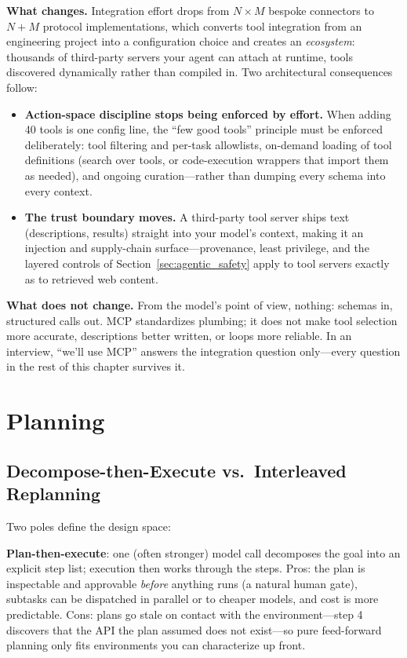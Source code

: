 \textbf{What changes.} Integration effort drops from $N \times M$ bespoke connectors to $N + M$ protocol implementations, which converts tool integration from an engineering project into a configuration choice and creates an \textit{ecosystem}: thousands of third-party servers your agent can attach at runtime, tools discovered dynamically rather than compiled in. Two architectural consequences follow:

\begin{itemize}
    \item \textbf{Action-space discipline stops being enforced by effort.} When adding 40 tools is one config line, the ``few good tools'' principle must be enforced deliberately: tool filtering and per-task allowlists, on-demand loading of tool definitions (search over tools, or code-execution wrappers that import them as needed), and ongoing curation---rather than dumping every schema into every context.
    \item \textbf{The trust boundary moves.} A third-party tool server ships text (descriptions, results) straight into your model's context, making it an injection and supply-chain surface---provenance, least privilege, and the layered controls of Section~\ref{sec:agentic_safety} apply to tool servers exactly as to retrieved web content.
\end{itemize}

\textbf{What does not change.} From the model's point of view, nothing: schemas in, structured calls out. MCP standardizes plumbing; it does not make tool selection more accurate, descriptions better written, or loops more reliable. In an interview, ``we'll use MCP'' answers the integration question only---every question in the rest of this chapter survives it.

\section{Planning}
\label{sec:agent_planning}

\subsection{Decompose-then-Execute vs.\ Interleaved Replanning}

Two poles define the design space:

\textbf{Plan-then-execute}: one (often stronger) model call decomposes the goal into an explicit step list; execution then works through the steps. Pros: the plan is inspectable and approvable \textit{before} anything runs (a natural human gate), subtasks can be dispatched in parallel or to cheaper models, and cost is more predictable. Cons: plans go stale on contact with the environment---step 4 discovers that the API the plan assumed does not exist---so pure feed-forward planning only fits environments you can characterize up front.

